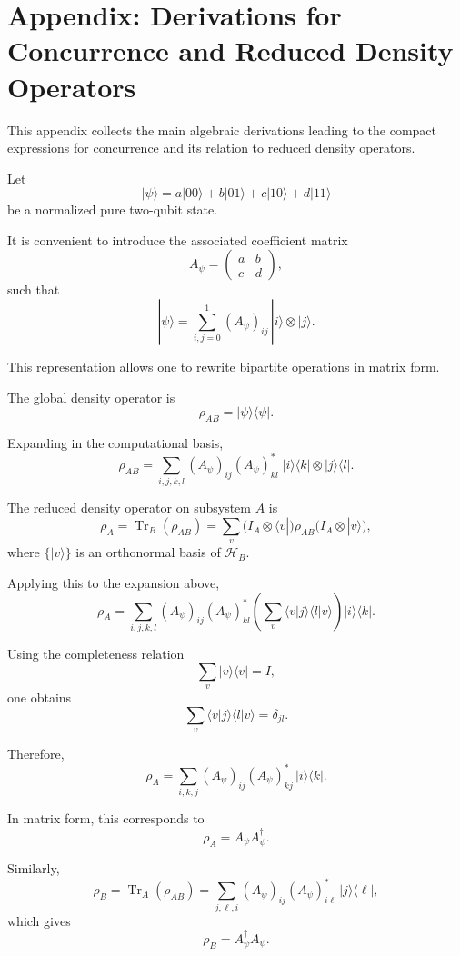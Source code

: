\documentclass[a4paper]{article}
\begin{document}
\section{Appendix: Derivations for Concurrence and Reduced Density Operators}

This appendix collects the main algebraic derivations leading to the compact expressions for concurrence and its relation to reduced density operators.

Let
\[
|\psi\rangle
=
a|00\rangle + b|01\rangle + c|10\rangle + d|11\rangle
\]
be a normalized pure two-qubit state.

It is convenient to introduce the associated coefficient matrix
\[
A_\psi =
\begin{pmatrix}
a & b\\
c & d
\end{pmatrix},
\]
such that
\[
|\psi\rangle
=
\sum_{i,j=0}^{1} (A_\psi)_{ij}\,|i\rangle \otimes |j\rangle.
\]

This representation allows one to rewrite bipartite operations in matrix form.

The global density operator is
\[
\rho_{AB} = |\psi\rangle\langle\psi|.
\]

Expanding in the computational basis,
\[
\rho_{AB}
=
\sum_{i,j,k,l}
(A_\psi)_{ij}(A_\psi)^*_{kl}
\;
|i\rangle\langle k|
\otimes
|j\rangle\langle l|.
\]

The reduced density operator on subsystem \(A\) is
\[
\rho_A = \operatorname{Tr}_B(\rho_{AB})
=
\sum_v
\bigl(I_A \otimes \langle v|\bigr)
\rho_{AB}
\bigl(I_A \otimes |v\rangle\bigr),
\]
where \(\{|v\rangle\}\) is an orthonormal basis of \(\mathcal{H}_B\).

Applying this to the expansion above,
\[
\rho_A
=
\sum_{i,j,k,l}
(A_\psi)_{ij}(A_\psi)^*_{kl}
\left(
\sum_v \langle v|j\rangle \langle l|v\rangle
\right)
|i\rangle\langle k|.
\]

Using the completeness relation
\[
\sum_v |v\rangle\langle v| = I,
\]
one obtains
\[
\sum_v \langle v|j\rangle \langle l|v\rangle = \delta_{jl}.
\]

Therefore,
\[
\rho_A
=
\sum_{i,k,j}
(A_\psi)_{ij}(A_\psi)^*_{kj}
\,|i\rangle\langle k|.
\]

In matrix form, this corresponds to
\[
\rho_A = A_\psi A_\psi^\dagger.
\]

Similarly,
\[
\rho_B = \operatorname{Tr}_A(\rho_{AB})
=
\sum_{j,\ell,i}
(A_\psi)_{ij}(A_\psi)^*_{i\ell}
\,|j\rangle\langle \ell|,
\]
which gives
\[
\rho_B = A_\psi^\dagger A_\psi.
\]
\end{document}
